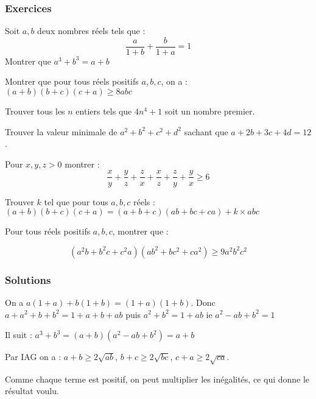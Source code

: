 \author{Auguste de Lambilly}

\subsubsection{Exercices}


\begin{exo}
Soit $a,b$ deux nombres réels tels que :
$$ \frac{a}{1+b}+\frac{b}{1+a}=1 $$
Montrer que $ a^3+b^3=a+b$
\end{exo}

\begin{exo}
Montrer que pour tous réels positifs $a,b,c$, on a : $ (a+b)(b+c)(c+a)\geq 8abc$
\end{exo}


\begin{exo}
Trouver tous les $n$ entiers tels que $4n^4+1$ soit un nombre premier.
\end{exo}


\begin{exo}
Trouver la valeur minimale de $a^2+b^2+c^2+d^2$ sachant que $a+2b+3c+4d=12$.
\end{exo}


\begin{exo}
Pour $x,y,z>0$ montrer : $$ \frac{x}{y}+\frac{y}{z}+\frac{z}{x}+\frac{x}{z}+\frac{z}{y}+\frac{y}{x}\geq 6$$
\end{exo}


\begin{exo}
Trouver $k$ tel que pour tous $a,b,c$ réels :
$(a+b)(b+c)(c+a)=(a+b+c)(ab+bc+ca)+k\times abc $
\end{exo}


\begin{exo}
Pour tous réels positifs $a,b,c$, montrer que :

$$ (a^2b+b^2c+c^2a)(ab^2+bc^2+ca^2)\geq 9a^2b^2c^2$$
\end{exo}


\subsubsection{Solutions}


\begin{sol}
On a $a(1+a)+b(1+b)=(1+a)(1+b)$. Donc $a+a^2+b+b^2=1+a+b+ab$ puis $a^2+b^2=1+ab$ ie $a^2-ab+b^2=1$

Il suit : $ a^3+b^3=(a+b)(a^2-ab+b^2)=a+b$
\end{sol}


\begin{sol}
Par IAG on a : $a+b\geq 2\sqrt{ab}$, $b+c\geq 2\sqrt{bc}$, $c+a\geq 2\sqrt{ca}$.

Comme chaque terme est positif, on peut multiplier les inégalités, ce qui donne le résultat voulu.
\end{sol}


